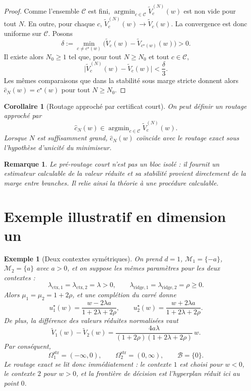 \documentclass[11pt,a4paper]{article}
\newtheorem{corollary}{Corollaire}[section]
\newtheorem{remark}{Remarque}[section]
\newtheorem{example}{Exemple}[section]
\DeclareMathOperator{\argmin}{argmin}
\newcommand{\Mcal}{\mathcal M}
\newcommand{\Ccal}{\mathcal C}
\newcommand{\Bcal}{\mathcal B}
\begin{document}
\begin{proof}
Comme l'ensemble \(\Ccal\) est fini, \(\argmin_{c\in\Ccal}\widetilde V_c^{(N)}(w)\) est non vide pour tout \(N\). En outre, pour chaque \(c\), \(\widetilde V_c^{(N)}(w)\to \widetilde V_c(w)\). La convergence est donc uniforme sur \(\Ccal\). Posons
\[
\delta:=\min_{c\neq c^\star(w)}\bigl(\widetilde V_c(w)-\widetilde V_{c^\star(w)}(w)\bigr)>0.
\]
Il existe alors \(N_0\ge 1\) tel que, pour tout \(N\ge N_0\) et tout \(c\in\Ccal\),
\[
\bigl|\widetilde V_c^{(N)}(w)-\widetilde V_c(w)\bigr|<\frac{\delta}{3}.
\]
Les mêmes comparaisons que dans la stabilité sous marge stricte donnent alors \(\hat c_N(w)=c^\star(w)\) pour tout \(N\ge N_0\).
\end{proof}

\begin{corollary}[Routage approché par certificat court]
On peut définir un routage approché par
\[
\hat c_N(w)\in\argmin_{c\in\Ccal}\widetilde V_c^{(N)}(w).
\]
Lorsque \(N\) est suffisamment grand, \(\hat c_N(w)\) coïncide avec le routage exact sous l'hypothèse d'unicité du minimiseur.
\end{corollary}

\begin{remark}
Le pré-routage court n'est pas un bloc isolé : il fournit un estimateur calculable de la valeur réduite et sa stabilité provient directement de la marge entre branches. Il relie ainsi la théorie à une procédure calculable.
\end{remark}

\section{Exemple illustratif en dimension un}

\begin{example}[Deux contextes symétriques]
On prend \(d=1\), \(\Mcal_1=\{-a\}\), \(\Mcal_2=\{a\}\) avec \(a>0\), et on suppose les mêmes paramètres pour les deux contextes :
\[
\lambda_{\mathrm{ctx},1}=\lambda_{\mathrm{ctx},2}=\lambda>0,
\qquad
\lambda_{\mathrm{ridge},1}=\lambda_{\mathrm{ridge},2}=\rho\ge 0.
\]
Alors \(\mu_1=\mu_2=1+2\rho\), et une complétion du carré donne
\[
u_1^\star(w)=\frac{w-2\lambda a}{1+2\lambda+2\rho},
\qquad
u_2^\star(w)=\frac{w+2\lambda a}{1+2\lambda+2\rho}.
\]
De plus, la différence des valeurs réduites normalisées vaut
\[
\widetilde V_1(w)-\widetilde V_2(w)
=
\frac{4a\lambda}{(1+2\rho)(1+2\lambda+2\rho)}\,w.
\]
Par conséquent,
\[
\Omega_1^{\mathrm{str}}=(-\infty,0),
\qquad
\Omega_2^{\mathrm{str}}=(0,\infty),
\qquad
\Bcal=\{0\}.
\]
Le routage exact se lit donc immédiatement : le contexte \(1\) est choisi pour \(w<0\), le contexte \(2\) pour \(w>0\), et la frontière de décision est l'hyperplan réduit ici au point \(0\).
\end{example}
\end{document}
